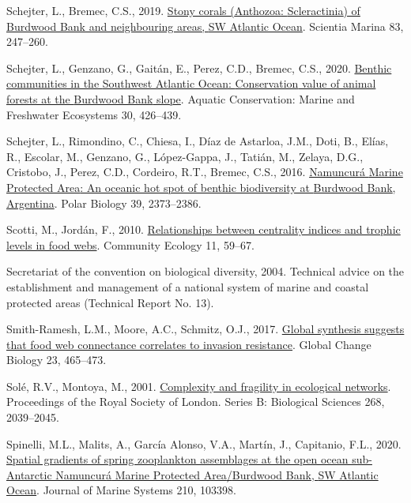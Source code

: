 \documentclass[
]{article}
\newlength{\cslhangindent}
\newenvironment{CSLReferences}[2] %
 {\begin{list}{}{%
  \setlength{\itemindent}{0pt}
  \setlength{\leftmargin}{0pt}
  \setlength{\parsep}{0pt}
  \ifodd #1
   \setlength{\leftmargin}{\cslhangindent}
   \setlength{\itemindent}{-1\cslhangindent}
  \fi
  \setlength{\itemsep}{#2\baselineskip}}}
 {\end{list}}
\begin{document}
\begin{CSLReferences}{1}{0}
Schejter, L., Bremec, C.S., 2019.
\href{https://doi.org/10.3989/scimar.04863.10A}{Stony corals
({Anthozoa}: {Scleractinia}) of {Burdwood Bank} and neighbouring areas,
{SW Atlantic Ocean}}. Scientia Marina 83, 247--260.

Schejter, L., Genzano, G., Gaitán, E., Perez, C.D., Bremec, C.S., 2020.
\href{https://doi.org/10.1002/aqc.3265}{Benthic communities in the
{Southwest Atlantic Ocean}: {Conservation} value of animal forests at
the {Burdwood Bank} slope}. Aquatic Conservation: Marine and Freshwater
Ecosystems 30, 426--439.

Schejter, L., Rimondino, C., Chiesa, I., Díaz de Astarloa, J.M., Doti,
B., Elías, R., Escolar, M., Genzano, G., López-Gappa, J., Tatián, M.,
Zelaya, D.G., Cristobo, J., Perez, C.D., Cordeiro, R.T., Bremec, C.S.,
2016. \href{https://doi.org/10.1007/s00300-016-1913-2}{Namuncur{á}
{Marine Protected Area}: An oceanic hot spot of benthic biodiversity at
{Burdwood Bank}, {Argentina}}. Polar Biology 39, 2373--2386.

Scotti, M., Jordán, F., 2010.
\href{https://doi.org/10.1556/ComEc.11.2010.1.9}{Relationships between
centrality indices and trophic levels in food webs}. Community Ecology
11, 59--67.

Secretariat of the convention on biological diversity, 2004. Technical
advice on the establishment and management of a national system of
marine and coastal protected areas (Technical Report No. 13).

Smith-Ramesh, L.M., Moore, A.C., Schmitz, O.J., 2017.
\href{https://doi.org/10.1111/gcb.13460}{Global synthesis suggests that
food web connectance correlates to invasion resistance}. Global Change
Biology 23, 465--473.

Solé, R.V., Montoya, M., 2001.
\href{https://doi.org/10.1098/rspb.2001.1767}{Complexity and fragility
in ecological networks}. Proceedings of the Royal Society of London.
Series B: Biological Sciences 268, 2039--2045.

Spinelli, M.L., Malits, A., García Alonso, V.A., Martín, J., Capitanio,
F.L., 2020. \href{https://doi.org/10.1016/j.jmarsys.2020.103398}{Spatial
gradients of spring zooplankton assemblages at the open ocean
sub-{Antarctic Namuncur{á} Marine Protected Area}/{Burdwood Bank}, {SW
Atlantic Ocean}}. Journal of Marine Systems 210, 103398.


\end{CSLReferences}
\end{document}
